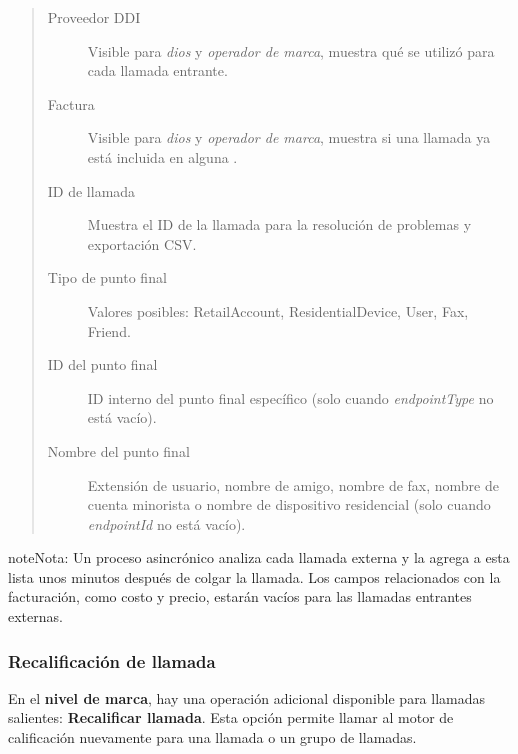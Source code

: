 \documentclass[letterpaper,10pt,spanish]{sphinxmanual}
\begin{document}
\begin{quote}
\begin{description}
\item[{Proveedor DDI}] \leavevmode
Visible para \emph{dios} y \emph{operador de marca}, muestra qué {\hyperref[administration_portal/brand/providers/ddi_providers:ddi\string-providers]{}} se utilizó para cada llamada entrante.

\item[{Factura}] \leavevmode
Visible para \emph{dios} y \emph{operador de marca}, muestra si una llamada ya está incluida en alguna {\hyperref[administration_portal/brand/invoicing/invoices:invoices]{}}.

\item[{ID de llamada}] \leavevmode
Muestra el ID de la llamada para la resolución de problemas y exportación CSV.

\item[{Tipo de punto final}] \leavevmode
Valores posibles: RetailAccount, ResidentialDevice, User, Fax, Friend.

\item[{ID del punto final}] \leavevmode
ID interno del punto final específico (solo cuando \emph{endpointType} no está vacío).

\item[{Nombre del punto final}] \leavevmode
Extensión de usuario, nombre de amigo, nombre de fax, nombre de cuenta minorista o nombre de dispositivo residencial (solo cuando \emph{endpointId} no está vacío).

\end{description}
\end{quote}

\begin{notice}{note}{Nota:}
Un proceso asincrónico analiza cada llamada externa y la agrega a esta lista unos minutos después de colgar la llamada. Los campos relacionados con la facturación, como costo y precio, estarán vacíos para las llamadas entrantes externas.
\end{notice}


\subsubsection{Recalificación de llamada}
\label{administration_portal/brand/calls/external_calls:call-rerating}
En el \textbf{nivel de marca}, hay una operación adicional disponible para llamadas salientes: \textbf{Recalificar llamada}. Esta opción permite llamar al motor de calificación nuevamente para una llamada o un grupo de llamadas.
\end{document}
